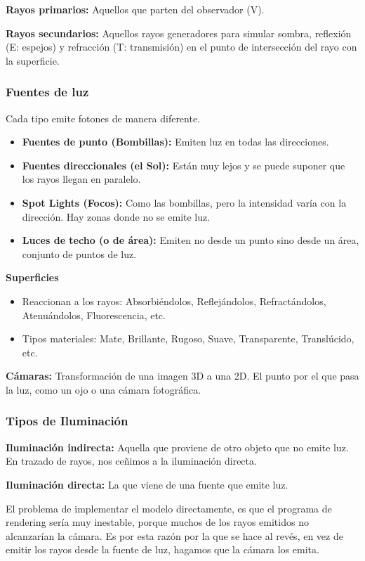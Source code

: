 \textbf{Rayos primarios:} Aquellos que parten del observador (V).

\textbf{Rayos secundarios:} Aquellos rayos generadores para simular sombra, reflexión (E: espejos) y refracción (T: transmisión) en el punto de intersección del rayo con la superficie.

\subsubsection{Fuentes de luz} 
Cada tipo emite fotones de manera diferente.
\begin{itemize}
    \item \textbf{Fuentes de punto (Bombillas):} Emiten luz en todas las direcciones.
    \item \textbf{Fuentes direccionales (el Sol):} Están muy lejos y se puede suponer que los rayos llegan en paralelo.
    \item \textbf{Spot Lights (Focos):} Como las bombillas, pero la intensidad varía con la dirección. Hay zonas donde no se emite luz.
    \item \textbf{Luces de techo (o de área):} Emiten no desde un punto sino desde un área, conjunto de puntos de luz.
\end{itemize}
\pagebreak

\textbf{Superficies}
\begin{itemize}
    \item Reaccionan a los rayos: Absorbiéndolos, Reflejándolos, Refractándolos, Atenuándolos, Fluorescencia, etc.
    \item Tipos materiales: Mate, Brillante, Rugoso, Suave, Transparente, Translúcido, etc.
\end{itemize}

\textbf{Cámaras:} Transformación de una imagen 3D a una 2D. El punto por el que pasa la luz, como un ojo o una cámara fotográfica.

\subsubsection{Tipos de Iluminación}
\textbf{Iluminación indirecta:} Aquella que proviene de otro objeto que no emite luz. En trazado de rayos, nos ceñimos a la iluminación directa.

\textbf{Iluminación directa:} La que viene de una fuente que emite luz.

El problema de implementar el modelo directamente, es que el programa de rendering sería muy inestable, porque muchos de los rayos emitidos no alcanzarían la cámara. Es por esta razón por la que se hace al revés, en vez de emitir los rayos desde la fuente de luz, hagamos que la cámara los emita.

